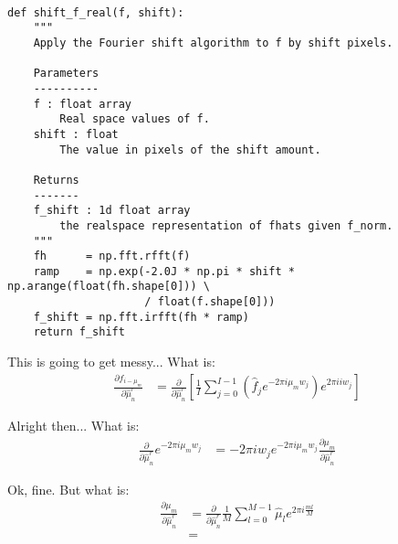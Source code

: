 \documentclass[11pt]{article}
\begin{document}
\begin{verbatim}

def shift_f_real(f, shift):
    """
    Apply the Fourier shift algorithm to f by shift pixels.
    
    Parameters
    ----------
    f : float array
        Real space values of f.
    shift : float
        The value in pixels of the shift amount.
            
    Returns
    -------
    f_shift : 1d float array
        the realspace representation of fhats given f_norm.
    """
    fh      = np.fft.rfft(f)
    ramp    = np.exp(-2.0J * np.pi * shift * np.arange(float(fh.shape[0])) \
                     / float(f.shape[0]))
    f_shift = np.fft.irfft(fh * ramp)
    return f_shift

\end{verbatim}


This is going to get messy... What is:
\begin{align}
  \frac{\partial f_{i-\mu_m} }{\partial \hat{\mu}^r_n} &= \frac{\partial}{\partial \hat{\mu}^r_n} \left[ \frac{1}{I} \sum_{j=0}^{I-1} (\hat{f}_j e^{-2\pi i \mu_m w_j}) e^{2\pi i i w_j} \right] 
\end{align}

Alright then... What is:
\begin{align}
  \frac{\partial}{\partial \hat{\mu}^r_n} e^{-2\pi i \mu_m w_j} &= -2 \pi i w_j  e^{-2\pi i \mu_m w_j} \frac{\partial \mu_m }{\partial \hat{\mu}^r_n}
\end{align}

Ok, fine. But what is:
\begin{align}
  \frac{\partial \mu_m }{\partial \hat{\mu}^r_n} &= \frac{\partial }{\partial \hat{\mu}^r_n} \frac{1}{M} \sum_{l=0}^{M-1} \hat{\mu}_l e^{2\pi i \frac{m l}{M}} \\
  &= 
\end{align}
\end{document}
